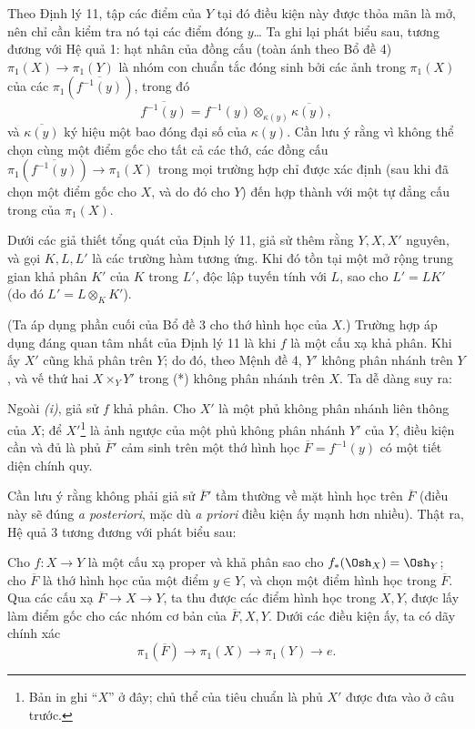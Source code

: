 Theo Định lý 11, tập các điểm của $Y$ tại đó điều kiện này được thỏa mãn là
mở, nên chỉ cần kiểm tra nó tại các điểm đóng $y$\ldots{} Ta ghi lại phát biểu
sau, tương đương với Hệ quả 1: hạt nhân của đồng cấu (toàn ánh theo Bổ đề 4)
$\pi_1(X)\longrightarrow\pi_1(Y)$ là nhóm con chuẩn tắc đóng sinh bởi các ảnh
trong $\pi_1(X)$ của các $\pi_1(\overline{f^{-1}(y)})$, trong đó
\[
  \overline{f^{-1}(y)}
  =f^{-1}(y)\otimes_{\kappa(y)}\overline{\kappa(y)},
\]
và $\overline{\kappa(y)}$ ký hiệu một bao đóng đại số của $\kappa(y)$. Cần lưu
ý rằng vì không thể chọn cùng một điểm gốc cho tất cả các thớ, các đồng cấu
$\pi_1(\overline{f^{-1}(y)})\longrightarrow\pi_1(X)$ trong mọi trường hợp chỉ
được xác định (sau khi đã chọn một điểm gốc cho $X$, và do đó cho $Y$) đến hợp
thành với một tự đẳng cấu trong của $\pi_1(X)$.

 Dưới các giả thiết tổng quát của Định lý 11, giả sử thêm
rằng $Y,X,X'$ nguyên, và gọi $K,L,L'$ là các trường hàm tương ứng. Khi đó tồn
tại một mở rộng trung gian khả phân $K'$ của $K$ trong $L'$, độc lập tuyến
tính với $L$, sao cho $L'=LK'$ (do đó $L'=L\otimes_K K'$).

(Ta áp dụng phần cuối của Bổ đề 3 cho thớ hình học của $X$.) Trường hợp áp dụng
đáng quan tâm nhất của Định lý 11 là khi $f$ là một cấu xạ khả phân. Khi ấy
$X'$ cũng khả phân trên $Y$; do đó, theo Mệnh đề 4, $Y'$ không phân nhánh trên
$Y$, và vế thứ hai $X\times_Y Y'$ trong (*) không phân nhánh trên $X$. Ta dễ
dàng suy ra:

 Ngoài \textit{(i)}, giả sử $f$ khả phân. Cho $X'$ là một
phủ không phân nhánh liên thông của $X$; để
$X'$\footnote{Bản in ghi “$X$” ở đây; chủ thể của tiêu chuẩn là phủ $X'$ được
đưa vào ở câu trước.} là ảnh ngược của một phủ không phân nhánh $Y'$ của $Y$,
điều kiện cần và đủ là phủ $\overline F'$ cảm sinh trên một thớ hình học
$\overline F=f^{-1}(y)$ có một tiết diện chính quy.

Cần lưu ý rằng không phải giả sử $\overline F'$ tầm thường về mặt hình học
trên $\overline F$ (điều này sẽ đúng \textit{a posteriori}, mặc dù
\textit{a priori} điều kiện ấy mạnh hơn nhiều). Thật ra, Hệ quả 3 tương đương
với phát biểu sau:

 Cho $f:X\longrightarrow Y$ là một cấu xạ proper và khả
phân sao cho $f_*(\Osh_X)=\Osh_Y$; cho $\overline F$ là thớ hình học của một
điểm $y\in Y$, và chọn một điểm hình học trong $\overline F$. Qua các cấu xạ
$\overline F\longrightarrow X\longrightarrow Y$, ta thu được các điểm hình
học trong $X,Y$, được lấy làm điểm gốc cho các nhóm cơ bản của
$\overline F,X,Y$. Dưới các điều kiện ấy, ta có dãy chính xác
\[
  \boxed{
    \pi_1(\overline F)\longrightarrow\pi_1(X)
    \longrightarrow\pi_1(Y)\longrightarrow e
  }.
\]

